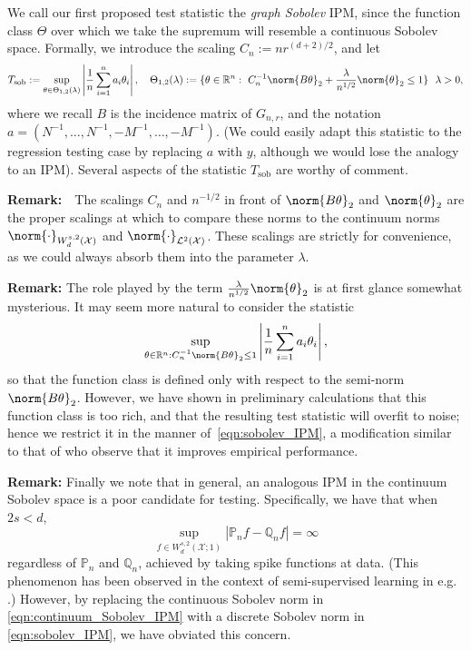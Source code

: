 \documentclass{article}
\newcommand{\Reals}{\mathbb{R}}
\newcommand{\abs}[1]{\left \lvert #1 \right \rvert}
\newcommand{\1}{\mathbf{1}}
\theoremstyle{alden}
\theoremstyle{aldenthm}
\theoremstyle{definition}
\theoremstyle{remark}
\begin{document}
We call our first proposed test statistic the \emph{graph Sobolev} IPM, since the function class $\Theta$ over which we take the supremum will resemble a continuous Sobolev space. Formally, we introduce the scaling $C_n := nr^{(d + 2)/2}$, and let
\begin{equation}
\label{eqn:sobolev_IPM}
T_{\textrm{sob}} := \sup_{\theta \in \Theta_{1,2}(\lambda)} \abs{\frac{1}{n}\sum_{i = 1}^{n} a_i \theta_i}, \quad  \Theta_{1,2}(\lambda) := \{\theta \in \Reals^n:~ C_n^{-1} \norm{B\theta}_2 + \frac{\lambda}{n^{1/2}}\norm{\theta}_2 \leq 1\} ~~ \lambda > 0, 
\end{equation}
where we recall $B$ is the incidence matrix of $G_{n,r}$, and the notation $a = \left(N^{-1},\ldots,N^{-1},-M^{-1},\ldots,-M^{-1}\right)$. (We could easily adapt this statistic to the regression testing case by replacing $a$ with $y$, although we would lose the analogy to an IPM).  Several aspects of the statistic $T_{\textrm{sob}}$ are worthy of comment. 

\textbf{Remark:}~~The scalings $C_n$ and $n^{-1/2}$ in front of $\norm{B\theta}_2$ and $\norm{\theta}_2$ are the proper scalings at which to compare these norms to the continuum norms $\norm{\cdot}_{W_d^{s,2}(\mathcal{X})}$ and $\norm{\cdot}_{\mathcal{L}^2(\mathcal{X})}$. These scalings are strictly for convenience, as we could always absorb them into the parameter $\lambda$.  

\textbf{Remark:} The role played by the term $\frac{\lambda}{n^{1/2}}\norm{\theta}_2$ is at first glance somewhat mysterious. It may seem more natural to consider the statistic
\begin{equation*}
\sup_{\theta \in \Reals^n: C_n^{-1}\norm{B\theta}_2 \leq 1} \abs{\frac{1}{n}\sum_{i = 1}^{n} a_i \theta_i}, 
\end{equation*}
so that the function class is defined only with respect to the semi-norm $\norm{B\theta}_2$. However, we have shown in preliminary calculations that this function class is too rich, and that the resulting test statistic will overfit to noise; hence we restrict it in the manner of~\eqref{eqn:sobolev_IPM}, a modification similar to that of \citet{arbel18} who observe that it improves empirical performance. 

\textbf{Remark:} Finally we note that in general, an analogous IPM in the continuum Sobolev space is a poor candidate for testing. Specifically, we have that when $2s < d$,
\begin{equation}
\label{eqn:continuum_Sobolev_IPM}
\sup_{f \in W_d^{s,2}(\mathcal{X};1)} \abs{\mathbb{P}_nf - \mathbb{Q}_nf} = \infty
\end{equation}
regardless of $\mathbb{P}_n$ and $\mathbb{Q}_n$, achieved by taking spike functions at data. (This phenomenon has been observed in the context of semi-supervised learning in e.g. \citet{nadler09,zhou11,slepcev17,alaoui16}.) However, by replacing the continuous Sobolev norm in \eqref{eqn:continuum_Sobolev_IPM} with a discrete Sobolev norm in \eqref{eqn:sobolev_IPM}, we have obviated this concern.  
\end{document}
